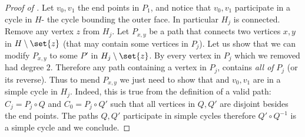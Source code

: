 \begin{proof}[Proof of ]
% 
    Let \(v_0,v_1\) the end points in \(P_1\), and notice that \(v_0,v_1\) participate in a cycle in \(H\)- the cycle bounding the outer face. In particular \(H_j\) is connected. Remove any vertex \(z\) from \(H_j\). Let \(P_{x,y}\) be a path that connects two vertices \(x,y\) in \(H \setminus \set{z}\) (that may contain some vertices in \(P_j\)). Let us show that we can modify \(P_{x,y}\) to some \(P'\) in \(H_j \setminus \set{z}\). By  every vertex in \(P_j\) which we removed had degree \(2\). Therefore any path containing a vertex in \(P_j\), contains \emph{all of} \(P_j\) (or its reverse). Thus to mend \(P_{x,y}\) we just need to show that and \(v_0,v_1\) are in a simple cycle in \(H_j\). Indeed, this is true from the definition of a valid path: \(C_j = P_j \circ Q\) and \(C_0 = P_j \circ Q'\) such that all vertices in \(Q,Q'\) are disjoint besides the end points. The paths \(Q,Q'\) participate in simple cycles therefore \(Q' \circ Q^{-1}\) is a simple cycle and we conclude.
\end{proof}


